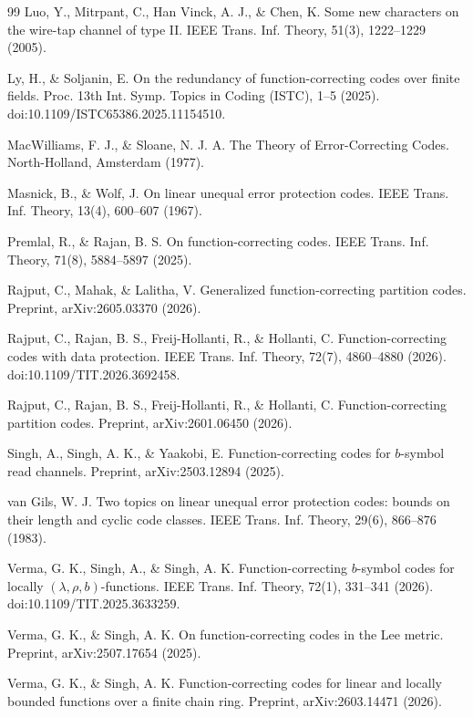 \documentclass[a4paper,12pt]{article}
\theoremstyle{plain}
\theoremstyle{definition}
\begin{document}
\begin{thebibliography}{99}
Luo, Y., Mitrpant, C., Han Vinck, A. J., \& Chen, K.
Some new characters on the wire-tap channel of type II.
IEEE Trans. Inf. Theory, 51(3), 1222--1229 (2005).

Ly, H., \& Soljanin, E.
On the redundancy of function-correcting codes over finite fields.
Proc. 13th Int. Symp. Topics in Coding (ISTC), 1--5 (2025).
doi:10.1109/ISTC65386.2025.11154510.

MacWilliams, F. J., \& Sloane, N. J. A.
The Theory of Error-Correcting Codes.
North-Holland, Amsterdam (1977).

Masnick, B., \& Wolf, J.
On linear unequal error protection codes.
IEEE Trans. Inf. Theory, 13(4), 600--607 (1967).


Premlal, R., \& Rajan, B. S.
On function-correcting codes.
IEEE Trans. Inf. Theory, 71(8), 5884--5897 (2025).

Rajput, C., Mahak, \& Lalitha, V.
Generalized function-correcting partition codes.
Preprint, arXiv:2605.03370 (2026).

Rajput, C., Rajan, B. S., Freij-Hollanti, R., \& Hollanti, C.
Function-correcting codes with data protection.
IEEE Trans. Inf. Theory, 72(7), 4860--4880 (2026).
doi:10.1109/TIT.2026.3692458.

Rajput, C., Rajan, B. S., Freij-Hollanti, R., \& Hollanti, C.
Function-correcting partition codes.
Preprint, arXiv:2601.06450 (2026).


Singh, A., Singh, A. K., \& Yaakobi, E.
Function-correcting codes for $b$-symbol read channels.
Preprint, arXiv:2503.12894 (2025).


van Gils, W. J.
Two topics on linear unequal error protection codes: bounds on their length and cyclic code classes.
IEEE Trans. Inf. Theory, 29(6), 866--876 (1983).

Verma, G. K., Singh, A., \& Singh, A. K.
Function-correcting $b$-symbol codes for locally
$(\lambda,\rho,b)$-functions.
IEEE Trans. Inf. Theory, 72(1), 331--341 (2026).
doi:10.1109/TIT.2025.3633259.

Verma, G. K., \& Singh, A. K.
On function-correcting codes in the Lee metric.
Preprint, arXiv:2507.17654 (2025).

Verma, G. K., \& Singh, A. K.
Function-correcting codes for linear and locally bounded functions
over a finite chain ring.
Preprint, arXiv:2603.14471 (2026).


\end{thebibliography}
\end{document}
